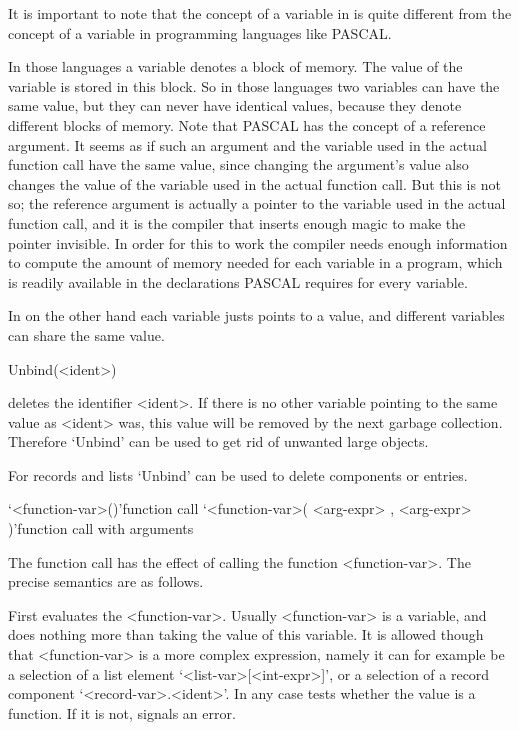 It is important to note that the concept of a variable in {\GAP} is quite
different from the concept of a variable in programming languages like
PASCAL.

In those languages a variable denotes a block of memory. The
value of the variable is stored in this block. So in those languages two
variables can have the same value, but they can never have identical
values, because they denote different blocks of memory.  Note that
PASCAL has the concept of a reference argument. It seems as if such an
argument and the variable used in the actual function call have the same
value, since changing the argument's value also changes the value of the
variable used in the actual function call.  But this is not so; the
reference argument is actually a pointer to the variable used in the
actual function call, and it is the compiler that inserts enough magic to
make the pointer invisible.  In order for this to work the compiler
needs enough information to compute the amount of memory needed for each
variable in a program, which is readily available in the declarations
PASCAL requires for every variable.

In {\GAP} on the other hand each variable justs points to a value,
and different variables can share the same value.

\>Unbind(<ident>)

deletes the identifier <ident>. If there is no other variable pointing to
the same value as <ident> was, this value will be removed by the next
garbage collection. Therefore `Unbind' can be used to get rid of unwanted
large objects.

For records and lists `Unbind' can be used to delete components or entries.


\>`<function-var>()'{function call}
\>`<function-var>( <arg-expr> {, <arg-expr>} )'{function call with arguments}

The function call has the effect of calling the function <function-var>.
The precise semantics are as follows.

First {\GAP} evaluates the <function-var>. Usually <function-var> is a
variable, and {\GAP} does nothing more than taking the value of this
variable.  It is allowed though that <function-var> is a more complex
expression, namely it can for example be a selection of a list element
`<list-var>[<int-expr>]', or  a  selection of  a  record component
`<record-var>.<ident>'. In any case {\GAP} tests whether the value is a
function. If it is not, {\GAP} signals an error.

